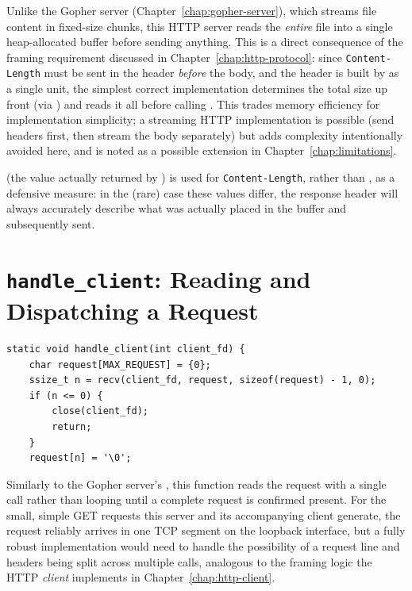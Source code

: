 Unlike the Gopher server (Chapter~\ref{chap:gopher-server}), which streams file content in fixed-size chunks, this HTTP server reads the \emph{entire} file into a single heap-allocated buffer before sending anything. This is a direct consequence of the framing requirement discussed in Chapter~\ref{chap:http-protocol}: since \texttt{Content-Length} must be sent in the header \emph{before} the body, and the header is built by  as a single unit, the simplest correct implementation determines the total size up front (via ) and reads it all before calling . This trades memory efficiency for implementation simplicity; a streaming HTTP implementation is possible (send headers first, then stream the body separately) but adds complexity intentionally avoided here, and is noted as a possible extension in Chapter~\ref{chap:limitations}.

 (the value actually returned by ) is used for \texttt{Content-Length}, rather than , as a defensive measure: in the (rare) case these values differ, the response header will always accurately describe what was actually placed in the buffer and subsequently sent.

\section{\texttt{handle\_client}: Reading and Dispatching a Request}

\begin{lstlisting}[style=cstyle]
static void handle_client(int client_fd) {
    char request[MAX_REQUEST] = {0};
    ssize_t n = recv(client_fd, request, sizeof(request) - 1, 0);
    if (n <= 0) {
        close(client_fd);
        return;
    }
    request[n] = '\0';
\end{lstlisting}

Similarly to the Gopher server's , this function reads the request with a single  call rather than looping until a complete request is confirmed present. For the small, simple GET requests this server and its accompanying client generate, the request reliably arrives in one TCP segment on the loopback interface, but a fully robust implementation would need to handle the possibility of a request line and headers being split across multiple  calls, analogous to the framing logic the HTTP \emph{client} implements in Chapter~\ref{chap:http-client}.

